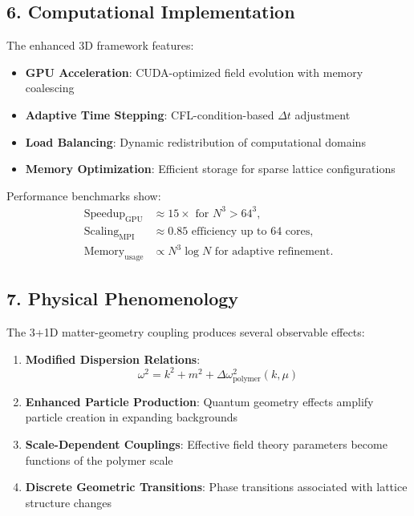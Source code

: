 \documentclass[12pt]{article}
\begin{document}
\subsection*{6. Computational Implementation}
The enhanced 3D framework features:
\begin{itemize}
  \item \textbf{GPU Acceleration}: CUDA-optimized field evolution with memory coalescing
  \item \textbf{Adaptive Time Stepping}: CFL-condition-based $\Delta t$ adjustment
  \item \textbf{Load Balancing}: Dynamic redistribution of computational domains
  \item \textbf{Memory Optimization}: Efficient storage for sparse lattice configurations
\end{itemize}

Performance benchmarks show:
\begin{align}
  \text{Speedup}_{\text{GPU}} &\approx 15\times \text{ for } N^3 > 64^3, \\
  \text{Scaling}_{\text{MPI}} &\approx 0.85 \text{ efficiency up to 64 cores}, \\
  \text{Memory}_{\text{usage}} &\propto N^3 \log N \text{ for adaptive refinement}.
\end{align}

\subsection*{7. Physical Phenomenology}
The 3+1D matter-geometry coupling produces several observable effects:
\begin{enumerate}
  \item \textbf{Modified Dispersion Relations}: 
  \[
    \omega^2 = k^2 + m^2 + \Delta\omega^2_{\text{polymer}}(k,\mu)
  \]
  
  \item \textbf{Enhanced Particle Production}: Quantum geometry effects amplify particle creation in expanding backgrounds
  
  \item \textbf{Scale-Dependent Couplings}: Effective field theory parameters become functions of the polymer scale
  
  \item \textbf{Discrete Geometric Transitions}: Phase transitions associated with lattice structure changes
\end{enumerate}
\end{document}
